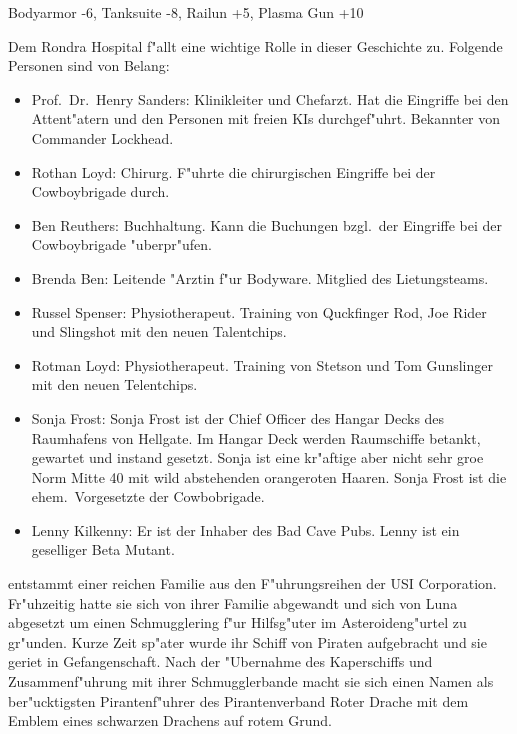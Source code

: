 Bodyarmor -6, Tanksuite -8, Railun +5, Plasma Gun +10


Dem Rondra Hospital f"allt eine wichtige Rolle in dieser Geschichte zu. Folgende Personen sind von Belang:

\begin{itemize}
    \item Prof.~Dr.~Henry Sanders: Klinikleiter und Chefarzt. Hat die Eingriffe bei den Attent"atern und den Personen mit freien KIs durchgef"uhrt. Bekannter von Commander Lockhead.
    \item Rothan Loyd: Chirurg. F"uhrte die chirurgischen Eingriffe bei der Cowboybrigade durch.
    \item Ben Reuthers: Buchhaltung. Kann die Buchungen bzgl.~der Eingriffe bei der Cowboybrigade "uberpr"ufen.
    \item Brenda Ben: Leitende "Arztin f"ur Bodyware. Mitglied des Lietungsteams.
    \item Russel Spenser: Physiotherapeut. Training von Quckfinger Rod, Joe Rider und Slingshot mit den neuen Talentchips.
    \item Rotman Loyd: Physiotherapeut. Training von Stetson und Tom Gunslinger mit den neuen Telentchips.    
\end{itemize}


\begin{itemize}
    \item Sonja Frost: Sonja Frost ist der Chief Officer des Hangar Decks des Raumhafens von Hellgate. Im Hangar Deck werden Raumschiffe betankt, gewartet und instand gesetzt. Sonja ist eine kr"aftige aber nicht sehr gro\3e Norm Mitte 40 mit wild abstehenden orangeroten Haaren. Sonja Frost ist die ehem.~Vorgesetzte der Cowbobrigade.
    \item Lenny Kilkenny: Er ist der Inhaber des Bad Cave Pubs. Lenny ist ein geselliger Beta Mutant.
\end{itemize}

\newpage
\newcommand{\xls}{\pinyin{Wang2} \pinyin{Xiao3} \pinyin{Long2}}
\renewcommand{\xl}{ \pinyin{Long2}}
\newsection[\xls]{Wang Xiao Long}

\xls{} entstammt einer reichen Familie aus den F"uhrungsreihen der USI Corporation. Fr"uhzeitig hatte sie sich von ihrer Familie abgewandt und sich von Luna abgesetzt um einen Schmugglering f"ur Hilfsg"uter im Asteroideng"urtel zu gr"unden. Kurze Zeit sp"ater wurde ihr Schiff von Piraten aufgebracht und sie geriet in Gefangenschaft. Nach der "Ubernahme des Kaperschiffs und Zusammenf"uhrung mit ihrer Schmugglerbande macht sie sich einen Namen als ber"ucktigsten Pirantenf"uhrer des Pirantenverband Roter Drache mit dem Emblem eines schwarzen Drachens auf rotem Grund.


